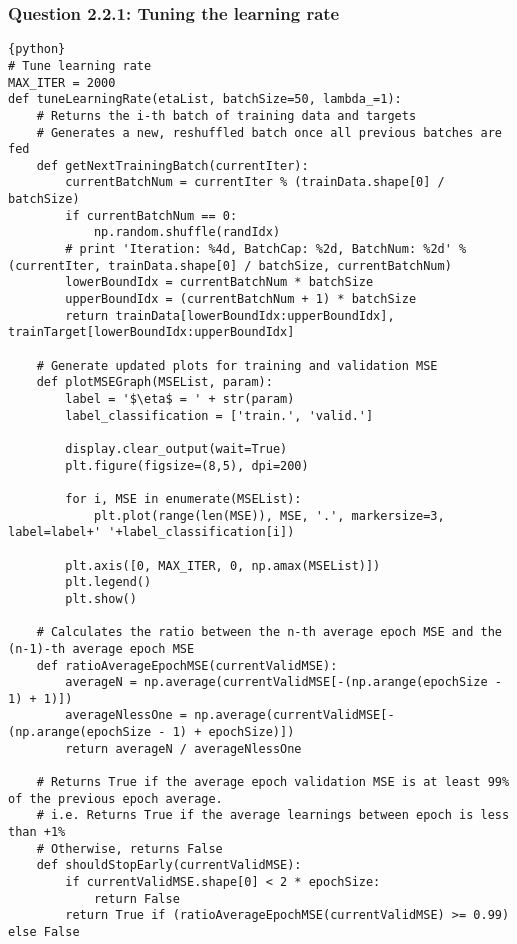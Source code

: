 \documentclass[a4paper,12pt]{article}
\begin{document}
\subsubsection{Question 2.2.1: Tuning the learning rate}
\begin{verbatim}
{python}
# Tune learning rate
MAX_ITER = 2000
def tuneLearningRate(etaList, batchSize=50, lambda_=1):    
    # Returns the i-th batch of training data and targets
    # Generates a new, reshuffled batch once all previous batches are fed
    def getNextTrainingBatch(currentIter):
        currentBatchNum = currentIter % (trainData.shape[0] / batchSize)
        if currentBatchNum == 0:
            np.random.shuffle(randIdx)
        # print 'Iteration: %4d, BatchCap: %2d, BatchNum: %2d' % (currentIter, trainData.shape[0] / batchSize, currentBatchNum)
        lowerBoundIdx = currentBatchNum * batchSize
        upperBoundIdx = (currentBatchNum + 1) * batchSize 
        return trainData[lowerBoundIdx:upperBoundIdx], trainTarget[lowerBoundIdx:upperBoundIdx]
    
    # Generate updated plots for training and validation MSE
    def plotMSEGraph(MSEList, param):
        label = '$\eta$ = ' + str(param)
        label_classification = ['train.', 'valid.']

        display.clear_output(wait=True)
        plt.figure(figsize=(8,5), dpi=200)
        
        for i, MSE in enumerate(MSEList):
            plt.plot(range(len(MSE)), MSE, '.', markersize=3, label=label+' '+label_classification[i])
        
        plt.axis([0, MAX_ITER, 0, np.amax(MSEList)])
        plt.legend()
        plt.show()
    
    # Calculates the ratio between the n-th average epoch MSE and the (n-1)-th average epoch MSE
    def ratioAverageEpochMSE(currentValidMSE):
        averageN = np.average(currentValidMSE[-(np.arange(epochSize - 1) + 1)])
        averageNlessOne = np.average(currentValidMSE[-(np.arange(epochSize - 1) + epochSize)])
        return averageN / averageNlessOne
    
    # Returns True if the average epoch validation MSE is at least 99% of the previous epoch average.
    # i.e. Returns True if the average learnings between epoch is less than +1%
    # Otherwise, returns False
    def shouldStopEarly(currentValidMSE):
        if currentValidMSE.shape[0] < 2 * epochSize:
            return False
        return True if (ratioAverageEpochMSE(currentValidMSE) >= 0.99) else False
    

\end{verbatim}
\end{document}
